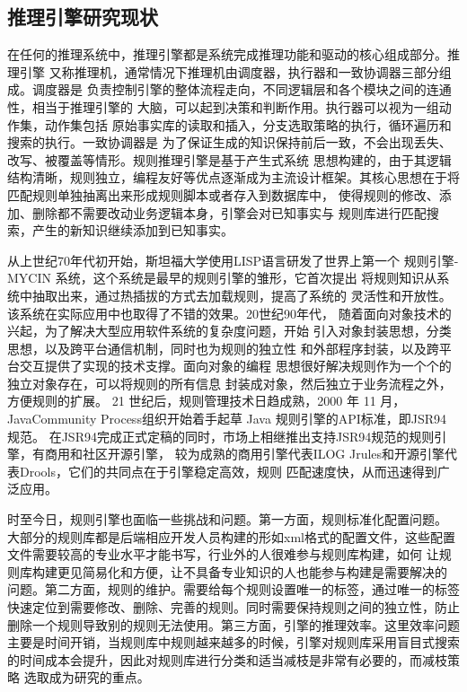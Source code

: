 \documentclass{standalone}
\begin{document}
\subsection{推理引擎研究现状}
在任何的推理系统中，推理引擎都是系统完成推理功能和驱动的核心组成部分。推理引擎
又称推理机，通常情况下推理机由调度器，执行器和一致协调器三部分组成。调度器是
负责控制引擎的整体流程走向，不同逻辑层和各个模块之间的连通性，相当于推理引擎的
大脑，可以起到决策和判断作用。执行器可以视为一组动作集，动作集包括
原始事实库的读取和插入，分支选取策略的执行，循环遍历和搜索的执行。一致协调器是
为了保证生成的知识保持前后一致，不会出现丢失、改写、被覆盖等情形。规则推理引擎是基于产生式系统
思想构建的，由于其逻辑结构清晰，规则独立，编程友好等优点逐渐成为主流设计框架。其核心思想在于将匹配规则单独抽离出来形成规则脚本或者存入到数据库中，
使得规则的修改、添加、删除都不需要改动业务逻辑本身，引擎会对已知事实与
规则库进行匹配搜索，产生的新知识继续添加到已知事实。

从上世纪70年代初开始，斯坦福大学使用LISP语言研发了世界上第一个
规则引擎-MYCIN 系统，这个系统是最早的规则引擎的雏形，它首次提出
将规则知识从系统中抽取出来，通过热插拔的方式去加载规则，提高了系统的
灵活性和开放性。该系统在实际应用中也取得了不错的效果。20世纪90年代，
随着面向对象技术的兴起，为了解决大型应用软件系统的复杂度问题，开始
引入对象封装思想，分类思想，以及跨平台通信机制，同时也为规则的独立性
和外部程序封装，以及跨平台交互提供了实现的技术支撑。面向对象的编程
思想很好解决规则作为一个个的独立对象存在，可以将规则的所有信息
封装成对象，然后独立于业务流程之外，方便规则的扩展。
 21 世纪后，规则管理技术日趋成熟，2000 年 11 月，
 JavaCommunity Process组织开始着手起草 Java 规则引擎的API标准，即JSR94 规范。
 在JSR94完成正式定稿的同时，市场上相继推出支持JSR94规范的规则引擎，有商用和社区开源引擎，
 较为成熟的商用引擎代表ILOG Jrules和开源引擎代表Drools，它们的共同点在于引擎稳定高效，规则
 匹配速度快，从而迅速得到广泛应用。


 时至今日，规则引擎也面临一些挑战和问题。第一方面，规则标准化配置问题。
 大部分的规则库都是后端相应开发人员构建的形如xml格式的配置文件，这些配置
 文件需要较高的专业水平才能书写，行业外的人很难参与规则库构建，如何
 让规则库构建更见简易化和方便，让不具备专业知识的人也能参与构建是需要解决的
 问题。第二方面，规则的维护。需要给每个规则设置唯一的标签，通过唯一的标签
 快速定位到需要修改、删除、完善的规则。同时需要保持规则之间的独立性，防止
 删除一个规则导致别的规则无法使用。第三方面，引擎的推理效率。这里效率问题
 主要是时间开销，当规则库中规则越来越多的时候，引擎对规则库采用盲目式搜索
 的时间成本会提升，因此对规则库进行分类和适当减枝是非常有必要的，而减枝策略
 选取成为研究的重点。
\end{document}
